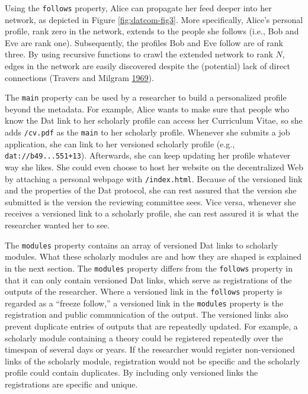 \documentclass[a5paper]{book}
\begin{document}
Using the \texttt{follows} property, Alice can propagate her feed deeper
into her network, as depicted in Figure \ref{fig:datcom-fig3}. More
specifically, Alice's personal profile, rank zero in the network,
extends to the people she follows (i.e., Bob and Eve are rank one).
Subsequently, the profiles Bob and Eve follow are of rank three. By
using recursive functions to crawl the extended network to rank \(N\),
edges in the network are easily discovered despite the (potential) lack
of direct connections (Travers and Milgram
\protect\hyperlink{ref-doi:10.2307ux2f2786545}{1969}).

The \texttt{main} property can be used by a researcher to build a
personalized profile beyond the metadata. For example, Alice wants to
make sure that people who know the Dat link to her scholarly profile can
access her Curriculum Vitae, so she adds \texttt{/cv.pdf} as the
\texttt{main} to her scholarly profile. Whenever she submits a job
application, she can link to her versioned scholarly profile (e.g.,
\texttt{dat://b49...551+13}). Afterwards, she can keep updating her
profile whatever way she likes. She could even choose to host her
website on the decentralized Web by attaching a personal webpage with
\texttt{/index.html}. Because of the versioned link and the properties
of the Dat protocol, she can rest assured that the version she submitted
is the version the reviewing committee sees. Vice versa, whenever she
receives a versioned link to a scholarly profile, she can rest assured
it is what the researcher wanted her to see.

The \texttt{modules} property contains an array of versioned Dat links
to scholarly modules. What these scholarly modules are and how they are
shaped is explained in the next section. The \texttt{modules} property
differs from the \texttt{follows} property in that it can only contain
versioned Dat links, which serve as registrations of the outputs of the
researcher. Where a versioned link in the \texttt{follows} property is
regarded as a \enquote{freeze follow,} a versioned link in the
\texttt{modules} property is the registration and public communication
of the output. The versioned links also prevent duplicate entries of
outputs that are repeatedly updated. For example, a scholarly module
containing a theory could be registered repeatedly over the timespan of
several days or years. If the researcher would register non-versioned
links of the scholarly module, registration would not be specific and
the scholarly profile could contain duplicates. By including only
versioned links the registrations are specific and unique.
\end{document}
